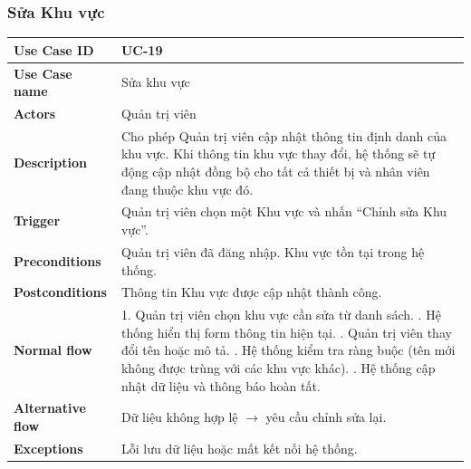 \subsubsection{Sửa Khu vực}
\begin{tabular}{|p{3.5cm}|p{9.5cm}|}
\hline
\textbf{Use Case ID} & UC-19 \\
\hline
\textbf{Use Case name} & Sửa khu vực \\
\hline
\textbf{Actors} & Quản trị viên \\
\hline
\textbf{Description} & 
Cho phép Quản trị viên cập nhật thông tin định danh của khu vực. Khi thông tin khu vực thay đổi, hệ thống sẽ tự động cập nhật đồng bộ cho tất cả thiết bị và nhân viên đang thuộc khu vực đó. \\
\hline
\textbf{Trigger} & 
Quản trị viên chọn một Khu vực và nhấn “Chỉnh sửa Khu vực”. \\
\hline
\textbf{Preconditions} & 
 Quản trị viên đã đăng nhập.\newline
Khu vực tồn tại trong hệ thống.
\\
\hline
\textbf{Postconditions} & 
Thông tin Khu vực được cập nhật thành công. \\
\hline
\textbf{Normal flow} & 
1. Quản trị viên chọn khu vực cần sửa từ danh sách. \newline
2. Hệ thống hiển thị form thông tin hiện tại. \newline
3. Quản trị viên thay đổi tên hoặc mô tả. \newline
4. Hệ thống kiểm tra ràng buộc (tên mới không được trùng với các khu vực khác). \newline
5. Hệ thống cập nhật dữ liệu và thông báo hoàn tất.
 \\
\hline
\textbf{Alternative flow} & 
Dữ liệu không hợp lệ $\rightarrow$ yêu cầu chỉnh sửa lại. \\
\hline
\textbf{Exceptions} & 
Lỗi lưu dữ liệu hoặc mất kết nối hệ thống. \\
\hline
\end{tabular}

